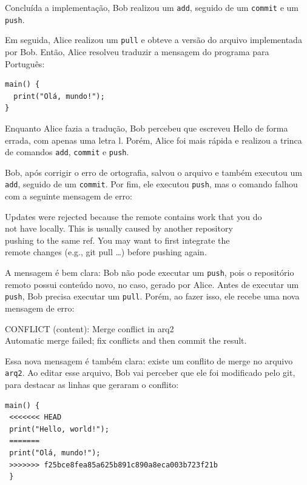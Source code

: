 \documentclass[
  11pt,
  twoside]{book}
\newcommand{\passthrough}[1]{#1}
\begin{document}
Concluída a implementação, Bob realizou um
\passthrough{\lstinline!add!}, seguido de um
\passthrough{\lstinline!commit!} e um \passthrough{\lstinline!push!}.

Em seguida, Alice realizou um \passthrough{\lstinline!pull!} e obteve a
versão do arquivo implementada por Bob. Então, Alice resolveu traduzir a
mensagem do programa para Português:

\begin{lstlisting}
main() {
  print("Olá, mundo!");
}
\end{lstlisting}

Enquanto Alice fazia a tradução, Bob percebeu que escreveu Hello de
forma errada, com apenas uma letra l. Porém, Alice foi mais rápida e
realizou a trinca de comandos \passthrough{\lstinline!add!},
\passthrough{\lstinline!commit!} e \passthrough{\lstinline!push!}.

Bob, após corrigir o erro de ortografia, salvou o arquivo e também
executou um \passthrough{\lstinline!add!}, seguido de um
\passthrough{\lstinline!commit!}. Por fim, ele executou
\passthrough{\lstinline!push!}, mas o comando falhou com a seguinte
mensagem de erro:

Updates were rejected because the remote contains work that you do\\
not have locally. This is usually caused by another repository\\
pushing to the same ref. You may want to first integrate the\\
remote changes (e.g., git pull \ldots) before pushing again.

A mensagem é bem clara: Bob não pode executar um
\passthrough{\lstinline!push!}, pois o repositório remoto possui
conteúdo novo, no caso, gerado por Alice. Antes de executar um
\passthrough{\lstinline!push!}, Bob precisa executar um
\passthrough{\lstinline!pull!}. Porém, ao fazer isso, ele recebe uma
nova mensagem de erro:

CONFLICT (content): Merge conflict in arq2\\
Automatic merge failed; fix conflicts and then commit the result.

Essa nova mensagem é também clara: existe um conflito de merge no
arquivo \passthrough{\lstinline!arq2!}. Ao editar esse arquivo, Bob vai
perceber que ele foi modificado pelo git, para destacar as linhas que
geraram o conflito:

\begin{lstlisting}
main() {                                                
 <<<<<<< HEAD                                     
 print("Hello, world!");                               
 =======                                                 
 print("Olá, mundo!");                                 
 >>>>>>> f25bce8fea85a625b891c890a8eca003b723f21b 
 }                                                       
\end{lstlisting}
\end{document}
